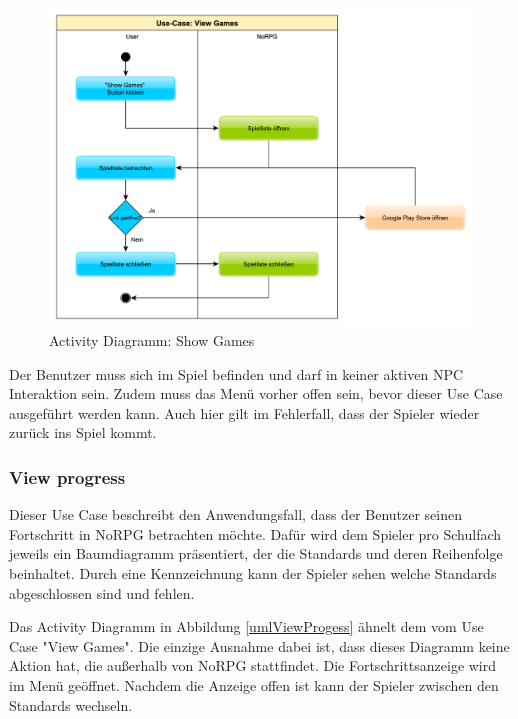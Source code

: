 			\begin{figure}[htbp]
				\centering 
				\label{umlShowGames}
				\includegraphics[width=12cm]{pics/ShowGames.pdf}
				\caption{Activity Diagramm: Show Games}
			\end{figure}

			Der Benutzer muss sich im Spiel befinden und darf in keiner aktiven \ac{NPC} Interaktion sein. Zudem muss das Menü vorher offen sein, bevor dieser Use Case ausgeführt werden kann. Auch hier gilt im Fehlerfall, dass der Spieler wieder zurück ins Spiel kommt.
	
		\subsubsection{View progress}
			Dieser Use Case beschreibt den Anwendungsfall, dass der Benutzer seinen Fortschritt in NoRPG betrachten möchte. Dafür wird dem Spieler pro Schulfach jeweils ein Baumdiagramm präsentiert, der die Standards und deren Reihenfolge beinhaltet. Durch eine Kennzeichnung kann der Spieler sehen welche Standards abgeschlossen sind und fehlen.  
			
			Das Activity Diagramm in Abbildung \ref{umlViewProgess} ähnelt dem vom Use Case "View Games". Die einzige Ausnahme dabei ist, dass dieses Diagramm keine Aktion hat, die außerhalb von NoRPG stattfindet. Die Fortschrittsanzeige wird im Menü geöffnet. Nachdem die Anzeige offen ist kann der Spieler zwischen den Standards wechseln.
			
